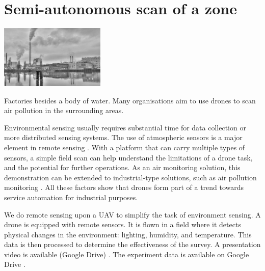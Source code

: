 \pagebreak
\section{Semi-autonomous scan of a zone}\label{section:environment}

  
\begin{marginfigure}%
  \includegraphics[width=5cm]{images/stage_system/stage_ref/factories_bw.jpg}
  \caption{ Factories besides a body of water. Many organisations aim to use drones to scan air pollution in the surrounding areas.}
  \label{fig:factories}
\end{marginfigure}


Environmental sensing usually requires substantial time for data collection or more distributed sensing systems.  The use of atmospheric sensors is a major element in remote sensing \cite{metrology_survey}. With a platform that can carry multiple types of sensors, a simple field scan can help understand the limitations of a drone task, and the potential for further operations. As an air monitoring solution, this demonstration can be extended to industrial-type solutions, such as air pollution monitoring \cite{sørensen_jacobsen_hansen_2017}. All these factors show that drones form part of a trend towards service automation for industrial purposes. 

We do remote sensing upon a UAV to simplify the task of environment sensing. A drone is equipped with remote sensors. It is flown in a field where it detects physical changes in the environment: lighting, humidity, and temperature.  This data is then processed to determine the effectiveness of the survey. A presentation video is available (Google Drive) \cite{fieldscan_video}. The experiment data is available on Google Drive \cite{fieldscan_dataset}.

